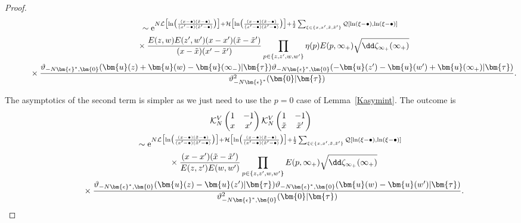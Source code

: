 \documentclass[10pt,a4paper]{amsart}
\numberwithin{equation}{section}
\begin{document}
\begin{proof}
\begin{gather}
 \qquad{}\sim{\rm e}^{N\mathcal{L}\bigl[\ln\bigl(\frac{(x - \bullet)(\tilde{x} - \bullet)}{(x' - \bullet)(\tilde{x}' - \bullet)}\bigr)\bigr] + \mathcal{H}\bigl[\ln\bigl(\frac{(x - \bullet)(\tilde{x} - \bullet)}{(x' - \bullet)(\tilde{x}' - \bullet)}\bigr)\bigr] + \frac{1}{2} \sum_{\xi \in \{x,x',\tilde{x},\tilde{x}'\}} \mathcal{Q}[\ln(\xi - \bullet),\ln(\xi - \bullet)]} \nonumber\\
 \qquad\quad{}\times \frac{E(z,w)E(z',w')(x - x')(\tilde{x} - \tilde{x}')}{(x - \tilde{x})(x' - \tilde{x}')} \prod_{p \in \{z,z',w,w'\}} \eta(p)E(p,\infty_+)\sqrt{\dd \zeta_{\infty_+}(\infty_+)} \nonumber\\
\qquad\quad{} \times \frac{\vartheta_{-N\bm{\epsilon}^*,\bm{0}} (\bm{u}(z) + \bm{u}(w) - \bm{u}(\infty_-) |\bm{\tau} )\vartheta_{-N \bm{\epsilon}^*,\bm{0}} ( - \bm{u}(z') - \bm{u}(w') + \bm{u}(\infty_+) |\bm{\tau} )}{\vartheta_{-N\bm{\epsilon}^*}^2 (\bm{0} |\bm{\tau} )}.\label{T2}
\end{gather}

The asymptotics of the second term is simpler as we just need to use the $p = 0$ case of Lemma~\ref{Kasymint}. The outcome is
\begin{gather}
\mathcal{K}_{N}^{V}\left(\begin{matrix} 1 & -1 \\ x & x' \end{matrix}\right)\mathcal{K}_{N}^{V}\left(\begin{matrix} 1 & -1 \\ \tilde{x} & \tilde{x}' \end{matrix}\right) \nonumber\\
\qquad {} \sim{\rm e}^{N\mathcal{L}\bigl[\ln\bigl(\frac{(x - \bullet)(\tilde{x} - \bullet)}{(x' - \bullet)(\tilde{x}' - \bullet)}\bigr)\bigr] + \mathcal{H}\bigl[\ln\bigl(\frac{(x - \bullet)(\tilde{x} - \bullet)}{(x' - \bullet)(\tilde{x}' - \bullet)}\bigr)\bigr] + \frac{1}{2} \sum_{\xi \in \{x,x',\tilde{x},\tilde{x}'\}} \mathcal{Q}[\ln(\xi - \bullet),\ln(\xi - \bullet)]} \nonumber\\
\qquad\quad{} \times \frac{(x - x')(\tilde{x} - \tilde{x}')}{E(z,z')E(w,w')} \prod_{p \in \{z,z',w,w'\}} E(p,\infty_+)\sqrt{\dd \zeta_{\infty_+}(\infty_+)} \nonumber\\
\qquad\quad{} \times \frac{\vartheta_{-N\bm{\epsilon}^*,\bm{0}} (\bm{u}(z) - \bm{u}(z')  |\bm{\tau} )\vartheta_{-N\bm{\epsilon}^*,\bm{0}} (\bm{u}(w) - \bm{u}(w') |\bm{\tau} )}{\vartheta_{-N\bm{\epsilon}^*,\bm{0}}^2 (\bm{0} |\bm{\tau} )}.\label{T3}
\end{gather}


\end{proof}
\end{document}
